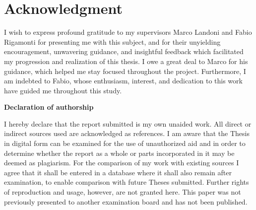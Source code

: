 \documentclass[a4paper, 11pt, twoside]{report}
\makeatletter
\def\cleardoublepage{\clearpage\if@twoside \ifodd\c@page\else%
    \hbox{}%
    \thispagestyle{empty}%
    \newpage%
    \if@twocolumn\hbox{}\newpage\fi\fi\fi}
\def\cleardoublepage{\clearpage\if@twoside \ifodd\c@page\else%
    \hbox{}%
    \thispagestyle{empty}%
    \newpage%
    \if@twocolumn\hbox{}\newpage\fi\fi\fi}
\makeatother
\begin{document}
\newpage
\section*{Acknowledgment}

I wish to express profound gratitude to my supervisors Marco Landoni and Fabio Rigamonti for presenting me with this  subject, and for their unyielding encouragement, unwavering guidance, and insightful feedback which facilitated my progression and realization of this thesis. I owe a great deal to Marco for his guidance, which helped me stay focused throughout the project. Furthermore, I am indebted to Fabio, whose enthusiasm, interest, and dedication to this work have guided me throughout this study.

\tableofcontents
\listoffigures
\listoftables


        \pagestyle{fancy}
        \renewcommand{\chaptermark}[1]{\markboth{#1}{}} 
        \renewcommand{\sectionmark}[1]{\markright{\thesection\ #1}} 
        \fancyhf{} %
        \fancyhead[LE,RO]{\bfseries\thepage} 
        \fancyhead[LO]{\bfseries\rightmark} 
        \fancyhead[RE]{\bfseries\leftmark} 
        \renewcommand{\headrulewidth}{0.8pt} 
        \renewcommand{\footrulewidth}{0pt} 
        \addtolength{\headheight}{0.5pt} %
        \fancypagestyle{plain}{%
        \fancyhead{} %
        \fancyfoot[C]{\bfseries \thepage}
        \renewcommand{\headrulewidth}{0pt} %
        } 

        \cleardoublepage{}
        \setcounter{page}{1}







\appendix 




\newpage
\Large
\noindent
\textbf{Declaration of authorship} 
\vspace{0.5cm}
\noindent
\normalsize

I hereby declare that the report submitted is my own unaided work. All direct 
or indirect sources used are acknowledged as references. I am aware that the 
Thesis in digital form can be examined for the use of unauthorized aid and in 
order to determine whether the report as a whole or parts incorporated in it may 
be deemed as plagiarism. For the comparison of my work with existing sources I 
agree that it shall be entered in a database where it shall also remain after 
examination, to enable comparison with future Theses submitted. Further rights 
of reproduction and usage, however, are not granted here. This paper was not 
previously presented to another examination board and has not been published.



\end{document}

